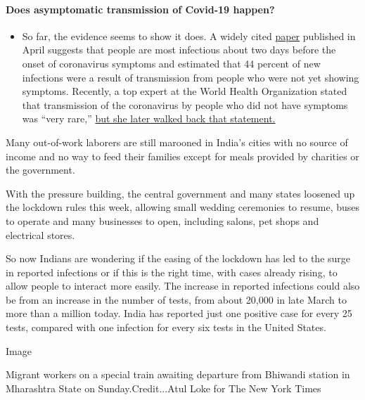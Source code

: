 \begin{itemize}
{  \paragraph{Does asymptomatic transmission of Covid-19
  happen?}\label{does-asymptomatic-transmission-of-covid-19-happen}}

  \begin{itemize}
  \tightlist
  \item
    So far, the evidence seems to show it does. A widely cited
    \href{https://www.nature.com/articles/s41591-020-0869-5}{paper}
    published in April suggests that people are most infectious about
    two days before the onset of coronavirus symptoms and estimated that
    44 percent of new infections were a result of transmission from
    people who were not yet showing symptoms. Recently, a top expert at
    the World Health Organization stated that transmission of the
    coronavirus by people who did not have symptoms was ``very rare,''
    \href{https://www.nytimes.com/2020/06/09/world/coronavirus-updates.html?action=click\&pgtype=Article\&state=default\&region=MAIN_CONTENT_3\&context=storylines_faq\#link-1f302e21}{but
    she later walked back that statement.}
  \end{itemize}
\end{itemize}

Many out-of-work laborers are still marooned in India's cities with no
source of income and no way to feed their families except for meals
provided by charities or the government.

With the pressure building, the central government and many states
loosened up the lockdown rules this week, allowing small wedding
ceremonies to resume, buses to operate and many businesses to open,
including salons, pet shops and electrical stores.

So now Indians are wondering if the easing of the lockdown has led to
the surge in reported infections or if this is the right time, with
cases already rising, to allow people to interact more easily. The
increase in reported infections could also be from an increase in the
number of tests, from about 20,000 in late March to more than a million
today. India has reported just one positive case for every 25 tests,
compared with one infection for every six tests in the United States.

Image

Migrant workers on a special train awaiting departure from Bhiwandi
station in Mharashtra State on Sunday.Credit...Atul Loke for The New
York Times

